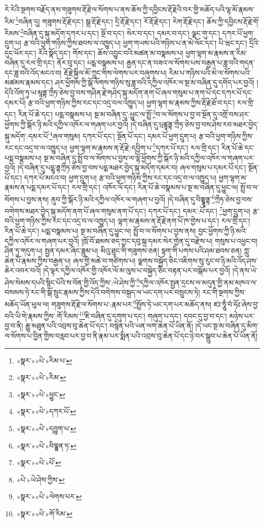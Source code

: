 རེ་རེའི་སྔགས་བརྗོད་ནས་གཟུགས་རྡོ་རྗེ་ལ་སོགས་པ་ནས་ཆོས་ཀྱི་དབྱིངས་རྡོ་རྗེའི་བར་གྱི་མཆོད་པའི་ལྷ་མོ་རྣམས་རིམ་\footnote{«སྣར་»«པེ་»རིམ་པ་}བཞིན་དུ། གཟུགས་རྡོ་རྗེ་དང་། སྒྲ་རྡོ་རྗེ་དང་། དྲི་རྡོ་རྗེ་དང་། རོ་རྡོ་རྗེ་དང་། རེག་རྡོ་རྗེ་དང་། ཆོས་ཀྱི་དབྱིངས་རྡོ་རྗེ་གོ་རིམས་\footnote{«སྣར་»«པེ་»རིམ་}བཞིན་དུ་སྐུ་མདོག་དཀར་པ་དང་། སྔོ་བ་དང་། སེར་བ་དང་། དམར་བ་དང་། ལྗང་གུ་དང་། དཀར་པོ་ཕྱག་དྲུག་པ། རྩ་བའི་ཕྱག་གཉིས་ཀྱིས་ཐབས་ལ་འཁྱུད་པ། ཕྱག་གཡས་པའི་གཉིས་པ་ན་མེ་ལོང་དང་། པི་ཝང་དང་། དྲིའི་དུང་ཕོར་དང་། རོའི་སྣོད་དང་། གོས་དང་། ཆོས་འབྱུང་བའི་མཚན་མ་བསྣམས་པ། ཕྱག་ལྷག་མ་རྣམས་ན་རིམ་བཞིན་དུ་རལ་གྲི་དང་། ནོར་བུ་དང་། པདྨ་བསྣམས་པ། རྒྱན་དང་ན་བཟའ་ལ་སོགས་པས་བརྒྱན་པ་ཟླ་བའི་གདན་དང་ཟླ་བའི་འོད་མངའ་བ། རྡོ་རྗེ་སྐྱིལ་མོ་ཀྲུང་གིས་ལེགས་པར་བཞུགས་པ། རིམ་པ་གཉིས་པའི་མེ་ལ་སོགས་པའི་མཚམས་རྣམས་དང་། ཤར་ཕྱོགས་ཀྱི་སྒོ་ལོགས་གཉིས་སུ་ཟླ་བའི་དཀྱིལ་འཁོར་ལ་སྔ་མ་བཞིན་དུ་དགོད་པར་བྱའོ། །དེའི་འོག་ཏུ་ཡ་མཱནྟ་ཀྲྀཏ་ཅེས་བྱ་བས་གཤིན་རྗེ་གཤེད་སྐུ་མདོག་ནག་པོ་ཞལ་གསུམ་པ་ནག་པོ་དང་དཀར་པོ་དང་དམར་པོ། རྩ་བའི་ཕྱག་གཉིས་ཀྱིས་རང་དང་འདྲ་བལ་འཁྱུད་པ། ཕྱག་ལྷག་མ་རྣམས་ཀྱིས་རྡོ་རྗེ་ཐོ་བ་དང་། རལ་གྲི་དང་། རིན་པོ་ཆེ་དང་། པདྨ་བསྣམས་པ། སྔ་མ་བཞིན་དུ་:ཕྱུང་ལ་སྤྲོ་\footnote{«སྣར་»«པེ་»ཕྱུང་}བ་ལ་སོགས་པ་བྱ་བ་སྔོན་དུ་འགྲོ་བས་ཤར་ཕྱོགས་ཀྱི་སྒོར་ཉི་མའི་དཀྱིལ་འཁོར་ལ་གཞག་པར་བྱའོ། །དེ་བཞིན་དུ་པྲཛྙཱནྟ་ཀྲྀཏ་ཅེས་བྱ་བས་ཤེས་རབ་མཐར་བྱེད་སྐུ་མདོག་:དམར་པོ་\footnote{«སྣར་»«པེ་»དཀར་པོ་}ཞལ་གསུམ། དཀར་པོ་དང་། སྔོན་པོ་དང་། དམར་པོ་ཕྱག་དྲུག་པ། རྩ་བའི་ཕྱག་གཉིས་ཀྱིས་རང་དང་འདྲ་བ་ལ་འཁྱུད་པ། ཕྱག་ལྷག་མ་རྣམས་ན་རྡོ་རྗེ་:དབྱིག་པ་\footnote{«སྣར་»«པེ་»དབྱུག་པ་}དཀར་པོ་དང་། རལ་གྲི་དང་། རིན་པོ་ཆེ་དང་པདྨ་བསྣམས་པ། སྔ་མ་བཞིན་དུ་སྤྲོ་བ་ལ་སོགས་པ་བྱས་ལ་ལྷོ་ཕྱོགས་ཀྱི་སྒོར་ཉི་མའི་དཀྱིལ་འཁོར་ལ་གཞག་པར་བྱའོ། །དེ་བཞིན་དུ་པདྨཱ་ནྟཀྲྀཏ་ཅེས་བྱ་བས་པདྨ་མཐར་བྱེད་སྐུ་མདོག་དམར་བ། ཞལ་གསུམ་པ་དམར་པོ་དང་། སྔོན་པོ་དང་། དཀར་པོ་མངའ་བ། ཕྱག་དྲུག་པ། རྩ་བའི་ཕྱག་གཉིས་ཀྱིས་རང་དང་འདྲ་བ་ལ་འཁྱུད་པ། ཕྱག་ལྷག་མ་རྣམས་ན་པདྨ་དམར་པོ་དང་། རལ་གྲི་དང་། འཁོར་ལོ་དང་། རིན་པོ་ཆེ་བསྣམས་པ་སྔ་མ་བཞིན་དུ་ཕྱུང་ལ། སྤྲོ་བ་ལ་སོགས་པ་བྱས་ནས། ནུབ་ཀྱི་སྒོར་ཉི་མའི་དཀྱིལ་འཁོར་ལ་གཞག་པ་བྱའོ། །དེ་བཞིན་དུ་བིགྷྣཱནྟ་\footnote{«སྣར་»«པེ་»བིགྣྷན་ཏ་}ཀྲྀཏ་ཅེས་བྱ་བས་བགེགས་མཐར་བྱེད་སྐུ་མདོག་ནག་པོ་ཞལ་གསུམ་ནག་པོ་དང་། དཀར་པོ་དང་། དམར་:པོ་དང་། \footnote{«སྣར་»«པེ་»པོ་}ཕྱག་དྲུག་པ། རྩ་བའི་ཕྱག་གཉིས་ཀྱིས་རང་དང་འདྲ་བ་ལ་འཁྱུད་པ། ལྷག་མ་རྣམས་ན་རྡོ་རྗེ་ནག་པོ་ཁ་གྱེས་པ་དང་། རལ་གྲི་དང་། རིན་པོ་ཆེ་དང་། པདྨ་བསྣམས་པ། སྔ་མ་བཞིན་དུ་ཕྱུང་ལ། སྤྲོ་བ་ལ་སོགས་པ་བྱས་ནས། བྱང་ཕྱོགས་ཀྱི་ཉི་མའི་དཀྱིལ་འཁོར་ལ་གཞག་པར་བྱའོ། །ཁྲོ་བོ་ཐམས་ཅད་ཀྱང་དབུ་སྐྲ་དམར་སེར་གྱེན་དུ་བརྫེས་པ། གསུས་པ་འཕྱང་བ། ཤིན་ཏུ་གདུག་པ། སྤྱན་དམར་ཞིང་ཟླུམ་པ། མིའུ་ཐུང་གི་གཟུགས་ཅན། སྟག་གི་པགས་པའི་ཤམ་ཐབས་ཅན། ཀླུ་ཆེན་པོ་རྣམས་ཀྱིས་བརྒྱན་པ། ཞལ་གྱི་མཆེ་བ་གཙིགས་པ། ལྗགས་བསྐྱོད་ཅིང་འཇིགས་སུ་རུང་བ་ཉི་མའི་འོད་ཤས་ཆེར་འབར་བའོ། །དེ་ལྟར་དཀྱིལ་འཁོར་གྱི་འཁོར་ལོ་མ་ལུས་པ་བསྐྱེད་ཅིང་བརྟན་པར་བསྒོམ་པར་བྱའོ། །དེ་ནས་ཡེ་ཤེས་སེམས་དཔའི་སྙིང་པོའི་ས་བོན་གྱི་འོད་ཀྱིས་:ཡེ་ཤེས་ཀྱི་\footnote{«པེ་»ཡེ་ཤེས་ཀྱིས་}དཀྱིལ་འཁོར་སྤྱན་དྲངས་ལ་མདུན་གྱི་ནམ་མཁའ་ལ་བསམས་ཏེ་རང་གི་སྒོ་སྲུང་རྣམས་ཀྱིས་དེའི་བགེགས་བསྐྲད་ལ་ཡང་དག་པར་བསྲུངས་ཏེ། རང་གི་སྔགས་ཀྱིས་མཆོད་ཡོན་ཕུལ་ལ། གཟུགས་རྡོ་རྗེ་ལ་སོགས་པ་:རྣམ་པར་\footnote{«སྣར་»«པེ་»ལེགས་པར་}སྤྲོས་ཏེ་ཡང་དག་པར་མཆོད་ནས། ཛཿ་ཧཱུྃ་བཾ་ཧོཿ་ཞེས་བྱ་བའི་ཡི་གེ་རྣམས་ཀྱིས་:གོ་རིམས་\footnote{«སྣར་»«པེ་»གོ་རིམ་}ཇི་བཞིན་དུ་དགུག་པ་དང་། གཞུག་པ་དང་། དབང་དུ་བྱ་བ་དང་། མཉེས་པར་བྱ་བ་ནི། རྒྱུ་མཐུན་པའི་འབྲས་བུ་ཆེན་པོ་དང་། བསྙེན་པའི་ཡན་ལག་ཆེན་པོ་ཡིན་ནོ། །དེ་ཡང་སྔ་མ་བཞིན་དུ་མིག་ལ་སོགས་པ་བྱིན་གྱིས་བརླབ་པར་བྱ་བ་ནི་རྣམ་པར་སྨིན་པའི་འབྲས་བུ་ཆེན་པོ་དང་ཉེ་བར་སྒྲུབ་པ་ཆེན་པོ་ཡིན་ནོ། 